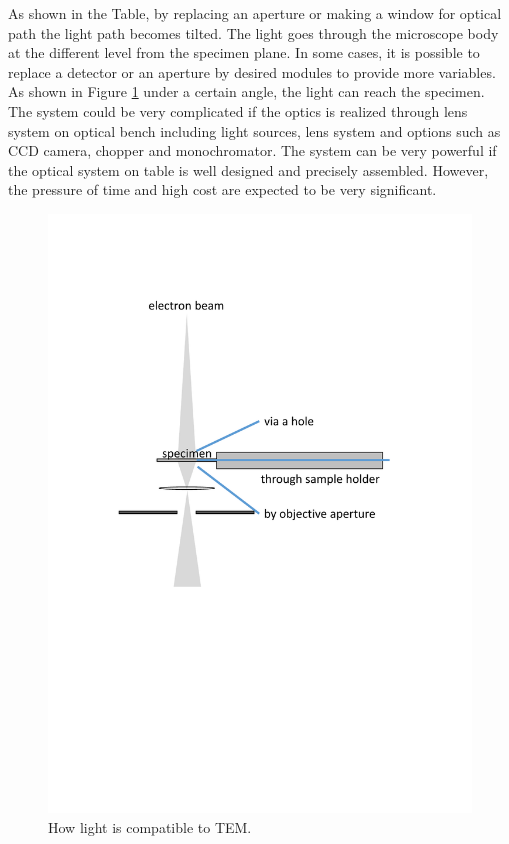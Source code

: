 As shown in the Table, by replacing an aperture or making a window for optical path the light path becomes tilted. The light goes through the microscope body at the different level from the specimen plane. In some cases, it is possible to replace a detector or an aperture by desired modules to provide more variables. As shown in Figure \ref{fig:2_1} under a certain angle, the light can reach the specimen. The system could be very complicated if the optics is realized through lens system on optical bench including light sources, lens system and options such as CCD camera, chopper and monochromator. The system can be very powerful if the optical system on table is well designed and precisely assembled. However, the pressure of time and high cost are expected to be very significant. \\

\begin{figure}  
\centering
\includegraphics[width=320pt]{figures/figure2_1}
\caption[Putting light into TEM.]{How light is compatible to TEM.
\label{fig:2_1}}
\end{figure}

